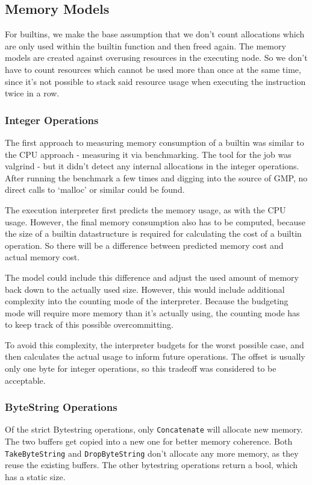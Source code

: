 \documentclass[a4paper]{article}
\begin{document}
\subsection{Memory Models}

For builtins, we make the base assumption that we don't count allocations which
are only used within the builtin function and then freed again. The memory
models are created against overusing resources in the executing node. So we
don't have to count resources which cannot be used more than once at the same
time, since it's not possible to stack said resource usage when executing the
instruction twice in a row.

\subsubsection*{Integer Operations}

The first approach to measuring memory consumption of a builtin was similar to
the CPU approach - measuring it via benchmarking. The tool for the job was
valgrind - but it didn't detect any internal allocations in the integer
operations. After running the benchmark a few times and digging into the source
of GMP, no direct calls to `malloc' or similar could be found.

The execution interpreter first predicts the memory usage, as with the CPU
usage. However, the final memory consumption also has to be computed, because
the size of a builtin datastructure is required for calculating the cost of a
builtin operation. So there will be a difference between predicted memory cost
and actual memory cost.

The model could include this difference and adjust the used amount of memory
back down to the actually used size. However, this would include additional
complexity into the counting mode of the interpreter. Because the budgeting mode
will require more memory than it's actually using, the counting mode has to keep
track of this possible overcommitting.

To avoid this complexity, the interpreter budgets for the worst possible case,
and then calculates the actual usage to inform future operations. The offset is
usually only one byte for integer operations, so this tradeoff was considered to
be acceptable.

\subsubsection*{ByteString Operations}

Of the strict Bytestring operations, only \verb|Concatenate| will allocate new
memory. The two buffers get copied into a new one for better memory coherence.
Both \verb|TakeByteString| and \verb|DropByteString| don't allocate any more
memory, as they reuse the existing buffers. The other bytestring operations
return a bool, which has a static size.
\end{document}
